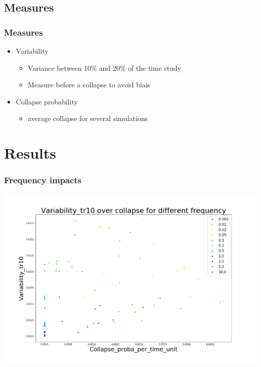 \documentclass{beamer}
\begin{document}
\subsection{Measures}
\begin{frame}
\frametitle{Measures}

\begin{itemize}
    \item Variability
    \begin{itemize}
        \item Variance between 10\% and 20\% of the time study
        \item Measure before a collapse to avoid biais
    \end{itemize}
    \item Collapse probability
    \begin{itemize}
        \item average collapse for several simulations
    \end{itemize}
\end{itemize}


\end{frame}


\section{Results}




\begin{frame}
\frametitle{Frequency impacts}
\includegraphics[width=9.cm]{loop.png}
\end{frame}
\end{document}

